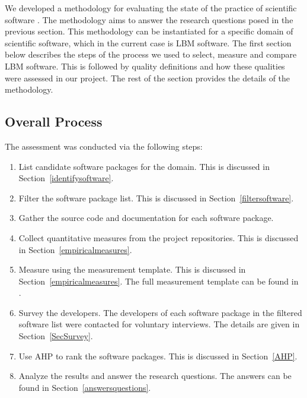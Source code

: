 \documentclass[final, 3p, times, authoryear]{elsarticle}
\begin{document}
We developed a methodology for evaluating the state of the practice of
scientific software \citep{SmithEtAl2021}.  The methodology aims to answer the
research questions posed in the previous section. This methodology can be
instantiated for a specific domain of scientific software, which in the current
case is LBM software.  The first section below describes the steps of the
process we used to select, measure and compare LBM software. This is followed by
quality definitions and how these qualities were assessed in our project. The
rest of the section provides the details of the methodology.

\subsection{Overall Process}

The assessment was conducted via the following steps: 

\begin{enumerate}
	\item List candidate software packages for the domain. This is discussed in
	Section~\ref{identifysoftware}.
	\item Filter the software package list. This is discussed in
	Section~\ref{filtersoftware}.
	\item Gather the source code and documentation for each software package.
	\item Collect quantitative measures from the project repositories. This is
	discussed in Section~\ref{empiricalmeasures}.
	\item Measure using the measurement template. This is discussed in
	Section~\ref{empiricalmeasures}. The full measurement template can be found
	in \citet{SmithEtAl2021}.
	\item Survey the developers. The developers of each software package in the
	filtered software list were contacted for voluntary interviews. The details
	are given in Section~\ref{SecSurvey}.
	\item Use AHP to rank the software packages. This is discussed in
	Section~\ref{AHP}.
	\item Analyze the results and answer the research questions. The answers can
	be found in Section~\ref{answersquestions}.
\end{enumerate}
\end{document}

